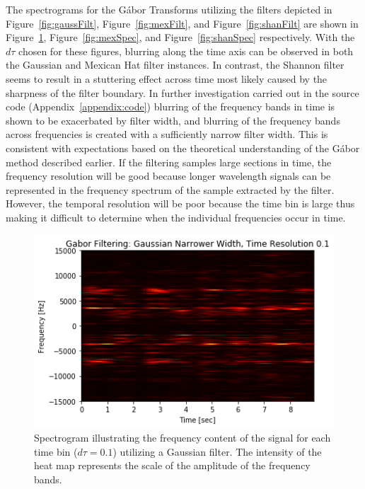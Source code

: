 \documentclass{article}
\begin{document}
The spectrograms for the G\'abor Transforms utilizing the filters depicted in Figure~\ref{fig:gaussFilt}, Figure~\ref{fig:mexFilt}, and Figure~\ref{fig:shanFilt} are shown in Figure~\ref{fig:gaussSpec}, Figure~\ref{fig:mexSpec}, and Figure~\ref{fig:shanSpec} respectively. With the $d\tau$ chosen for these figures, blurring along the time axis can be observed in both the Gaussian and Mexican Hat filter instances. In contrast, the Shannon filter seems to result in a stuttering effect across time most likely caused by the sharpness of the filter boundary. In further investigation carried out in the source code (Appendix~\ref{appendix:code}) blurring of the frequency bands in time is shown to be exacerbated by filter width, and blurring of the frequency bands across frequencies is created with a sufficiently narrow filter width. This is consistent with expectations based on the theoretical understanding of the G\'abor method described earlier. If the filtering samples large sections in time, the frequency resolution will be good because longer wavelength signals can be represented in the frequency spectrum of the sample extracted by the filter. However, the temporal resolution will be poor because the time bin is large thus making it difficult to determine when the individual frequencies occur in time.

\begin{figure}
    \centering
    \includegraphics[width=0.7\linewidth]{HW2_DanielBurnham_files/HW2_DanielBurnham_5_6.png}
    \caption{Spectrogram illustrating the frequency content of the signal for each time bin ($d\tau = 0.1$) utilizing a Gaussian filter. The intensity of the heat map represents the scale of the amplitude of the frequency bands.}
    \label{fig:gaussSpec}
\end{figure}
\end{document}
